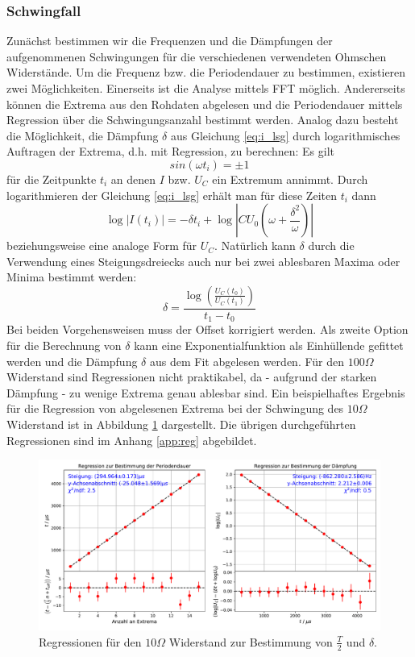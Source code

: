 \documentclass[a4paper, 12pt]{scrartcl}
\begin{document}
\subsubsection{Schwingfall}
Zunächst bestimmen wir die Frequenzen und die Dämpfungen der aufgenommenen Schwingungen für die verschiedenen verwendeten Ohmschen Widerstände. Um die Frequenz bzw. die Periodendauer zu bestimmen, existieren zwei Möglichkeiten. Einerseits ist die Analyse mittels FFT möglich. Andererseits können die Extrema aus den Rohdaten abgelesen und die Periodendauer mittels Regression über die Schwingungsanzahl bestimmt werden.
Analog dazu besteht die Möglichkeit, die Dämpfung $\delta$ aus Gleichung \ref{eq:i_lsg} durch logarithmisches Auftragen der Extrema, d.h. mit Regression, zu berechnen: Es gilt
$$sin(\omega t_i) = \pm 1$$
für die Zeitpunkte $t_i$ an denen $I$ bzw. $U_C$ ein Extremum annimmt. Durch logarithmieren der Gleichung \ref{eq:i_lsg} erhält man für diese Zeiten $t_i$ dann
$$\log \lvert I(t_i)\rvert = -\delta t_i + \log\left\lvert CU_0 \left(\omega+\frac{\delta^2}{\omega}\right)\right\rvert$$
beziehungsweise eine analoge Form für $U_C$. Natürlich kann $\delta$ durch die Verwendung eines Steigungsdreiecks auch nur bei zwei ablesbaren Maxima oder Minima bestimmt werden:
$$\delta = \frac{\log\left(\frac{U_C(t_0)}{U_C(t_1)}\right)}{t_1-t_0}$$
Bei beiden Vorgehensweisen muss der Offset korrigiert werden. Als zweite Option für die Berechnung von $\delta$ kann eine Exponentialfunktion als Einhüllende gefittet werden und die Dämpfung $\delta$ aus dem Fit abgelesen werden.
Für den $100\Omega$ Widerstand sind Regressionen nicht praktikabel, da - aufgrund der starken Dämpfung - zu wenige Extrema genau ablesbar sind. Ein beispielhaftes Ergebnis für die Regression von abgelesenen Extrema bei der Schwingung des $10\Omega$ Widerstand ist in Abbildung \ref{abb:reg1} dargestellt. Die übrigen durchgeführten Regressionen sind im Anhang \ref{app:reg} abgebildet.

\begin{figure}[h]
\centering
\includegraphics[width=\textwidth]{plots/reg_schwingung3.pdf}
\caption{Regressionen für den $10\Omega$ Widerstand zur Bestimmung von $\frac{T}{2}$ und $\delta$.}
\label{abb:reg1}
\end{figure}
\end{document}
